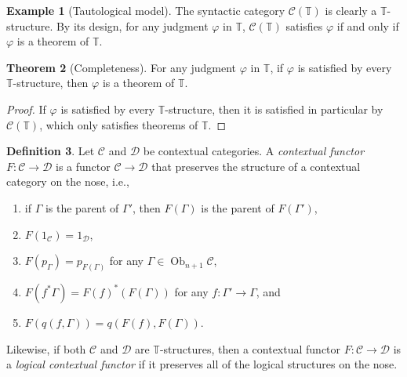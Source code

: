 \documentclass[10pt,letterpaper,cm]{nupset}
\theoremstyle{definition}
\newtheorem{definition}{Definition}[subsection]
\newtheorem{exmp}[definition]{Example}
\theoremstyle{theorem}
\newtheorem{theorem}[definition]{Theorem}
\theoremstyle{remark}
\newtheorem{remark}[definition]{Remark}
\DeclareMathOperator{\ob}{Ob}
\newcommand{\0}{\mathbf{0}}
\newcommand{\1}{\mathbf{1}}
\newcommand{\2}{\mathbf{2}}
\renewcommand{\c}{\mathscr{C}}
\renewcommand{\d}{\mathscr{D}}
\newcommand{\T}{\mathbb T}
\newcommand{\be}{\begin{enumerate}}
\newcommand{\ee}{\end{enumerate}}
\begin{document}
\begin{exmp}[Tautological model]\label{gen}
The syntactic category $\c(\T)$ is clearly a $\T$-structure. By its design, for any judgment $\varphi$ in $\T$, $\c(\T)$ satisfies $\varphi$ if and only if $\varphi$ is a theorem of $\T$. 
\end{exmp}


\begin{theorem}[Completeness]\label{comp}
For  any judgment $\varphi$ in $\T$, if $\varphi$ is satisfied by every $\T$-structure, then $\varphi$ is a theorem of $\T$.
\end{theorem}
\begin{proof}
If $\varphi$ is satisfied by every $\T$-structure, then it is satisfied  in particular by $\c(\T)$, which only satisfies theorems of $\T$.
\end{proof}

\begin{definition}\label{cxtfun}
Let $\c$ and $\d$ be contextual categories. A  \textit{contextual functor $F: \c \to \d$} is a functor $\c \to \d$ that preserves the structure of a contextual category on the nose, i.e.,
\be[label=(\roman*)]
\item if $\Gamma$ is the parent of $\Gamma'$, then $F(\Gamma)$ is the parent of $F(\Gamma')$,
\item $F(1_{\c}) = 1_{\d}$,
\item $F(p_{\Gamma}) = p_{F(\Gamma)}$ for any $\Gamma \in \ob_{n+1}{\c}$, 
\item $F(f^{\ast}{\Gamma}) = F(f)^{\ast}(F(\Gamma))$ for any $f: \Gamma' \to \Gamma$, and 
\item $F(q(f, \Gamma))= q(F(f), F(\Gamma))$.
\ee
Likewise, if both $\c$ and $\d$ are $\T$-structures, then a contextual functor $F: \c \to \d$ is a \textit{logical contextual functor} if it preserves all of the logical structures on the nose. 
\end{definition}

\begin{comment}
\begin{remark}
\Cref{cxtfun} is stronger than the notion of a homomorphism in classical model theory, which merely must preserve the relations and functions of a structure
\end{remark}
\end{comment}

\medskip
\end{document}
